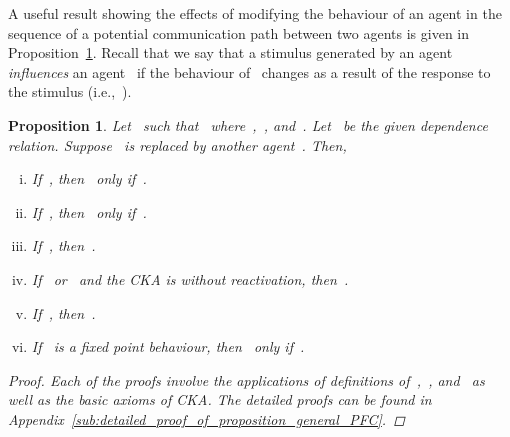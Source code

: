 \documentclass[copyright,creativecommons]{eptcs}
\makeatletter
\newcommand{\ie}{\textrm{i.e.,}\@\xspace}
\newcommand{\CCKAabbrv}{CKA\@\xspace}
\newtheorem{proposition}{Proposition}
\makeatother
\begin{document}
A useful result showing the effects of modifying the behaviour of an agent in the sequence of a potential communication path between two agents is given in Proposition~\ref{prop:general_PFC}. Recall that we say that a stimulus generated by an agent~ \emph{influences} an agent~ if the behaviour of~ changes as a result of the response to the stimulus (\ie~).

\begin{proposition}
\label{prop:general_PFC}
	Let~ such that~ where~,~, and~. Let~ be the given dependence relation. Suppose~ is replaced by another agent~. Then,
	\begin{enumerate}[(i)]
		\item \label{prop:PFC_seq} 
			If~, then~ only if~.
		\item \label{prop:PFC_plus} 
			If~, then~ only if~.
		\item \label{prop:PFC_iterSeq} 
			If~, then~.
		\item \label{prop:PFC_inactive_idle} 
			If~ or~ and the \emph{\CCKAabbrv} is without reactivation, then~.
		\item \label{prop:PFC_orbit} 
			If~, then~.
		\item \label{prop:PFC_fixed} 
			If~ is a fixed point behaviour, then~ only if~.
	\end{enumerate}
	
	\begin{proof}
		Each of the proofs involve the applications of definitions of~,~, and~ as well as the basic axioms of \CCKAabbrv. The detailed proofs can be found in Appendix~\ref{sub:detailed_proof_of_proposition_general_PFC}.
	\end{proof}
\end{proposition}
\end{document}
